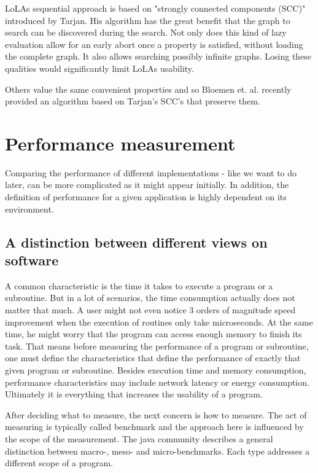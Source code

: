 LoLAs sequential approach is based on "strongly connected components (SCC)" introduced by Tarjan\cite{tarjan1972depth}. His algorithm has the great benefit that the graph to search can be discovered during the search. Not only does this kind of lazy evaluation allow for an early abort once a property is satisfied, without loading the complete graph. It also allows searching possibly infinite graphs. Losing these qualities would significantly limit LoLAs usability.

Others value the same convenient properties and so Bloemen et. al. recently provided an algorithm based on Tarjan's SCC's that preserve them\cite{bloemen2016multi}.

\section{Performance measurement}
\label{benchmarking}
Comparing the performance of different implementations - like we want to do later, can be more complicated as it might appear initially. In addition, the definition of performance for a given application is highly dependent on its environment.

\subsection{A distinction between different views on software}
A common characteristic is the time it takes to execute a program or a subroutine. But in a lot of scenarios, the time consumption actually does not matter that much. A user might not even notice 3 orders of magnitude speed improvement when the execution of routines only take microseconds. At the same time, he might worry that the program can access enough memory to finish its task. That means before measuring the performance of a program or subroutine, one must define the characteristics that define the performance of exactly that given program or subroutine. Besides execution time and memory consumption, performance characteristics may include network latency or energy consumption. Ultimately it is everything that increases the usability of a program.

After deciding what to measure, the next concern is how to measure. The act of measuring is typically called benchmark and the approach here is influenced by the scope of the measurement. The java community describes a general distinction between macro-, meso- and micro-benchmarks\cite{oaks2014java}. Each type addresses a different scope of a program.

